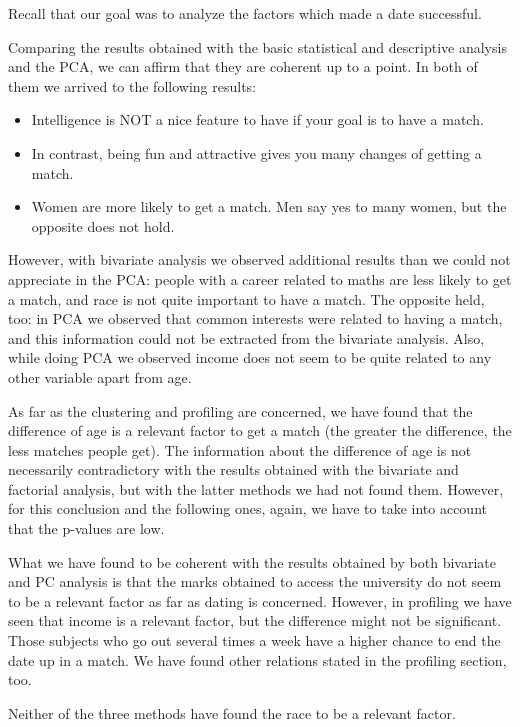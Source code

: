

Recall that our goal was to analyze the factors which made a date successful.

Comparing the results obtained with the basic statistical and descriptive analysis and the PCA, we can affirm that they are coherent up to a point. In both of them we arrived to the following results:
\begin{itemize}
    \item Intelligence is NOT a nice feature to have if your goal is to have a match.
    \item In contrast, being fun and attractive gives you many changes of getting a match.
    \item Women are more likely to get a match. Men say yes to many women, but the opposite does not hold.
\end{itemize}

However, with bivariate analysis we observed additional results than we could not appreciate in the PCA: people with a career related to maths are less likely to get a match, and race is not quite important to have a match. The opposite held, too: in PCA we observed that common interests were related to having a match, and this information could not be extracted from the bivariate analysis. Also, while doing PCA we observed income does not seem to be quite related to any other variable apart from age.

As far as the clustering and profiling are concerned, we have found that the difference of age is a relevant factor to get a match (the greater the difference, the less matches people get). The information about the difference of age is not necessarily contradictory with the results obtained with the bivariate and factorial analysis, but with the latter methods we had not found them. However, for this conclusion and the following ones, again, we have to take into account that the p-values are low. 

What we have found to be coherent with the results obtained by both bivariate and PC analysis is that the marks obtained to access the university do not seem to be a relevant factor as far as dating is concerned. However, in profiling we have seen that income is a relevant factor, but the difference might not be significant. Those subjects who go out several times a week have a higher chance to end the date up in a match. We have found other relations stated in the profiling section, too.

Neither of the three methods have found the race to be a relevant factor.

